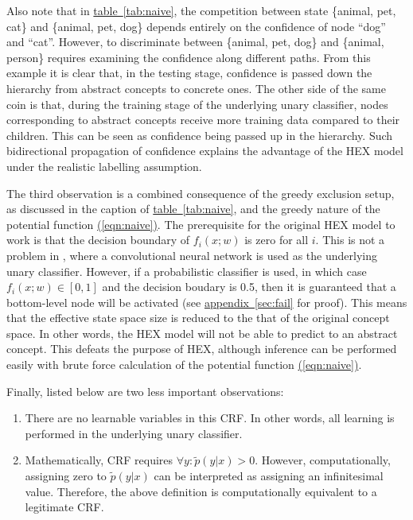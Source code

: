\documentclass[11pt,a4paper]{article}
\begin{document}
Also note that in \hyperref[tab:naive]{table~\ref{tab:naive}}, the competition between state \{animal, pet, cat\} and \{animal, pet, dog\} depends entirely on the confidence of node ``dog'' and ``cat''. However, to discriminate between \{animal, pet, dog\} and \{animal, person\} requires examining the confidence along different paths. From this example it is clear that, in the testing stage, confidence is passed down the hierarchy from abstract concepts to concrete ones. The other side of the same coin is that, during the training stage of the underlying unary classifier, nodes corresponding to abstract concepts receive more training data compared to their children. This can be seen as confidence being passed up in the hierarchy. Such bidirectional propagation of confidence explains the advantage of the HEX model under the realistic labelling assumption.

The third observation is a combined consequence of the greedy exclusion setup, as discussed in the caption of \hyperref[tab:naive]{table~\ref{tab:naive}}, and the greedy nature of the potential function \hyperref[eqn:naive]{(\ref{eqn:naive})}. The prerequisite for the original HEX model to work is that the decision boundary of $f_i(x;w)$ is zero for all $i$. This is not a problem in \cite{deng2014large}, where a convolutional neural network \cite{krizhevsky2012imagenet} is used as the underlying unary classifier. However, if a probabilistic classifier is used, in which case $f_i(x;w)\in[0,1]$ and the decision boudary is 0.5, then it is guaranteed that a bottom-level node will be activated (see \hyperref[sec:fail]{appendix~\ref{sec:fail}} for proof). This means that the effective state space size is reduced to the that of the original concept space. In other words, the HEX model will not be able to predict to an abstract concept. This defeats the purpose of HEX, although inference can be performed easily with brute force calculation of the potential function \hyperref[eqn:naive]{(\ref{eqn:naive})}.

Finally, listed below are two less important observations:
\begin{enumerate}
\item There are no learnable variables in this CRF. In other words, all learning is performed in the underlying unary classifier.
\item Mathematically, CRF requires $\forall y:\tilde{p}(y|x)>0$. However, computationally, assigning zero to $\tilde{p}(y|x)$ can be interpreted as assigning an infinitesimal value. Therefore, the above definition is computationally equivalent to a legitimate CRF.
\end{enumerate}
\end{document}
